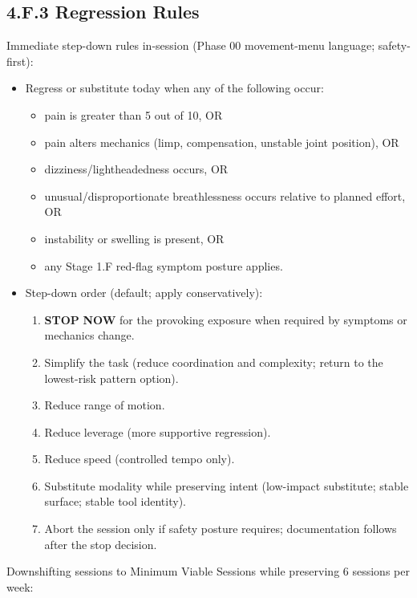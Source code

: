\documentclass[10pt]{article}
\begin{document}
\subsection*{4.F.3 Regression Rules}
{}

Immediate step-down rules in-session (Phase 00 movement-menu language; safety-first):

\begin{itemize}
\item Regress or substitute today when any of the following occur:
  \begin{itemize}
  \item pain is greater than 5 out of 10, OR
  \item pain alters mechanics (limp, compensation, unstable joint position), OR
  \item dizziness/lightheadedness occurs, OR
  \item unusual/disproportionate breathlessness occurs relative to planned effort, OR
  \item instability or swelling is present, OR
  \item any Stage 1.F red-flag symptom posture applies.
  \end{itemize}
\item Step-down order (default; apply conservatively):
  \begin{enumerate}
  \item \textbf{STOP} \textbf{NOW} for the provoking exposure when required by symptoms or mechanics change.
  \item Simplify the task (reduce coordination and complexity; return to the lowest-risk pattern option).
  \item Reduce range of motion.
  \item Reduce leverage (more supportive regression).
  \item Reduce speed (controlled tempo only).
  \item Substitute modality while preserving intent (low-impact substitute; stable surface; stable tool identity).
  \item Abort the session only if safety posture requires; documentation follows after the stop decision.
  \end{enumerate}
\end{itemize}

Downshifting sessions to Minimum Viable Sessions while preserving 6 sessions per week:
\end{document}
